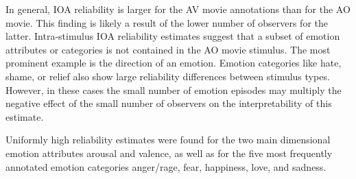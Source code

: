 \documentclass[10pt,a4paper,twocolumn]{article}
\begin{document}
In general, IOA reliability is larger for the AV movie annotations than for the
AO movie. This finding is likely a result of the lower number of observers for
the latter. Intra-stimulus IOA reliability estimates suggest that a subset of
emotion attributes or categories is not contained in the AO movie stimulus.
The most prominent example is the direction of an emotion. Emotion categories
like hate, shame, or relief also show large reliability differences between
stimulus types. However, in these cases the small number of emotion episodes
may multiply the negative effect of the small number of observers on the
interpretability of this estimate.

Uniformly high reliability estimates were found for the two main dimensional
emotion attributes arousal and valence, as well as for the five most frequently
annotated emotion categories anger/rage, fear, happiness, love, and sadness.
\end{document}
